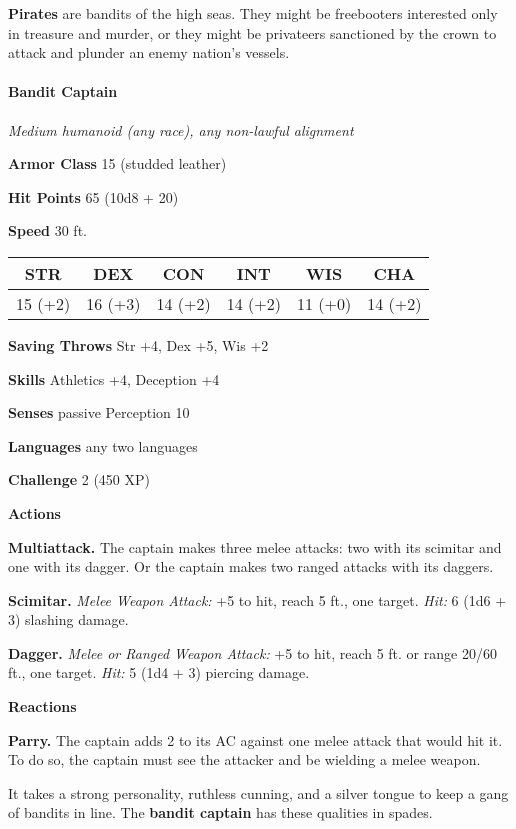 \documentclass[
]{article}
\begin{document}
\textbf{Pirates} are bandits of the high seas. They might be freebooters
interested only in treasure and murder, or they might be privateers
sanctioned by the crown to attack and plunder an enemy nation's vessels.

\hypertarget{bandit-captain}{%
\paragraph{Bandit Captain}\label{bandit-captain}}

\emph{Medium humanoid (any race), any non-lawful alignment}

\textbf{Armor Class} 15 (studded leather)

\textbf{Hit Points} 65 (10d8 + 20)

\textbf{Speed} 30 ft.

\begin{longtable}[]{@{}cccccc@{}}
\toprule
STR & DEX & CON & INT & WIS & CHA\tabularnewline
\midrule
\endhead
15 (+2) & 16 (+3) & 14 (+2) & 14 (+2) & 11 (+0) & 14 (+2)\tabularnewline
\bottomrule
\end{longtable}

\textbf{Saving Throws} Str +4, Dex +5, Wis +2

\textbf{Skills} Athletics +4, Deception +4

\textbf{Senses} passive Perception 10

\textbf{Languages} any two languages

\textbf{Challenge} 2 (450 XP)

\textbf{Actions}

\textbf{Multiattack.} The captain makes three melee attacks: two with
its scimitar and one with its dagger. Or the captain makes two ranged
attacks with its daggers.

\textbf{Scimitar.} \emph{Melee Weapon Attack:} +5 to hit, reach 5 ft.,
one target. \emph{Hit:} 6 (1d6 + 3) slashing damage.

\textbf{Dagger.} \emph{Melee or Ranged Weapon Attack:} +5 to hit, reach
5 ft. or range 20/60 ft., one target. \emph{Hit:} 5 (1d4 + 3) piercing
damage.

\textbf{Reactions}

\textbf{Parry.} The captain adds 2 to its AC against one melee attack
that would hit it. To do so, the captain must see the attacker and be
wielding a melee weapon.

It takes a strong personality, ruthless cunning, and a silver tongue to
keep a gang of bandits in line. The \textbf{bandit captain} has these
qualities in spades.
\end{document}
